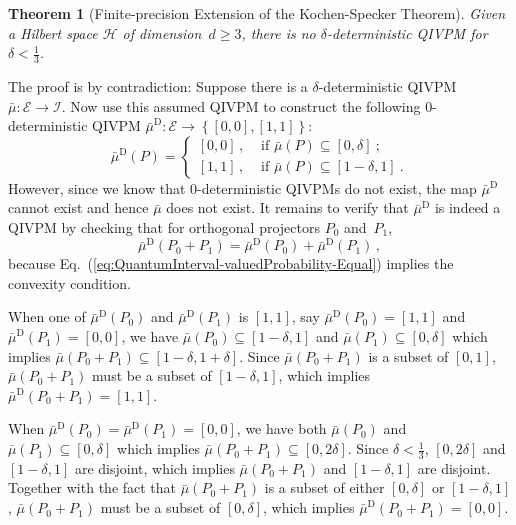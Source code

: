 \documentclass[english,reprint, aps, prl,superscriptaddress, showpacs,
showkeys, longbibliography, amsmath, amssymb, floatfix]{revtex4-1}
\theoremstyle{plain}
\newtheorem{thm}{Theorem}
\theoremstyle{definition}
\newcommand{\Hilb}{\mathcal{H}}
\newcommand{\events}{\ensuremath{\mathcal{E}}}
\newcommand{\imposs}{\ensuremath{\left[0,0\right]}}
\newcommand{\necess}{\ensuremath{\left[1,1\right]}}
\begin{document}
\begin{thm}[Finite-precision Extension of the Kochen-Specker Theorem]
\label{cor:Kochen-Specker-IVPM} Given a Hilbert space $\Hilb$ of
dimension~$d\ge3$, there is no $\delta$-deterministic QIVPM for
$\delta<\frac{1}{3}$.\end{thm}

The proof is by contradiction: Suppose there is a $\delta$-deterministic
QIVPM~$\bar{\mu}:\events\rightarrow\mathscr{I}$. Now use this assumed
QIVPM to construct the following $0$-deterministic QIVPM $\bar{\mu}^{\textrm{D}}:\events\rightarrow\left\{ \imposs,\necess\right\} $:
\begin{equation}
\bar{\mu}^{\textrm{D}}\left(P\right)=\begin{cases}
\imposs\,, & \textrm{ if }\bar{\mu}\left(P\right)\subseteq\left[0,\delta\right]\:;\\
\necess\,, & \textrm{ if }\bar{\mu}\left(P\right)\subseteq\left[1-\delta,1\right]\:.
\end{cases}
\end{equation}
However, since we know that $0$-deterministic QIVPMs do not exist,
the map $\bar{\mu}^{\textrm{D}}$ cannot exist and hence $\bar{\mu}$
does not exist. It remains to verify that $\bar{\mu}^{\textrm{D}}$
is indeed a QIVPM by checking that for orthogonal projectors $P_{0}$
and~$P_{1}$, 
\begin{equation}
\bar{\mu}^{\textrm{D}}\left(P_{0}+P_{1}\right)=\bar{\mu}^{\textrm{D}}\left(P_{0}\right)+\bar{\mu}^{\textrm{D}}\left(P_{1}\right)\,,\label{eq:QuantumInterval-valuedProbability-Equal}
\end{equation}
because Eq.~(\ref{eq:QuantumInterval-valuedProbability-Equal}) implies
the convexity condition.

When one of $\bar{\mu}^{\textrm{D}}\left(P_{0}\right)$ and $\bar{\mu}^{\textrm{D}}\left(P_{1}\right)$
is $\necess$, say $\bar{\mu}^{\textrm{D}}\left(P_{0}\right)=\necess$
and $\bar{\mu}^{\textrm{D}}\left(P_{1}\right)=\imposs$, we have $\bar{\mu}\left(P_{0}\right)\subseteq\left[1-\delta,1\right]$
and $\bar{\mu}\left(P_{1}\right)\subseteq\left[0,\delta\right]$ which
implies $\bar{\mu}\left(P_{0}+P_{1}\right)\subseteq\left[1-\delta,1+\delta\right]$.
Since $\bar{\mu}\left(P_{0}+P_{1}\right)$ is a subset of $\left[0,1\right]$,
$\bar{\mu}\left(P_{0}+P_{1}\right)$ must be a subset of $\left[1-\delta,1\right]$,
which implies $\bar{\mu}^{\textrm{D}}\left(P_{0}+P_{1}\right)=\necess$.

When
$\bar{\mu}^{\textrm{D}}\left(P_{0}\right)=\bar{\mu}^{\textrm{D}}\left(P_{1}\right)=\imposs$,
we have both $\bar{\mu}\left(P_{0}\right)$ and
$\bar{\mu}\left(P_{1}\right)\subseteq\left[0,\delta\right]$ which
implies
$\bar{\mu}\left(P_{0}+P_{1}\right)\subseteq\left[0,2\delta\right]$.
Since $\delta<\frac{1}{3}$, $\left[0,2\delta\right]$ and
$\left[1-\delta,1\right]$ are disjoint, which implies
$\bar{\mu}\left(P_{0}+P_{1}\right)$ and $\left[1-\delta,1\right]$ are
disjoint. Together with the fact that
$\bar{\mu}\left(P_{0}+P_{1}\right)$ is a subset of either
$\left[0,\delta\right]$ or $\left[1-\delta,1\right]$,
$\bar{\mu}\left(P_{0}+P_{1}\right)$ must be a subset of
$\left[0,\delta\right]$, which implies
$\bar{\mu}^{\textrm{D}}\left(P_{0}+P_{1}\right)=\imposs$.
\end{document}
